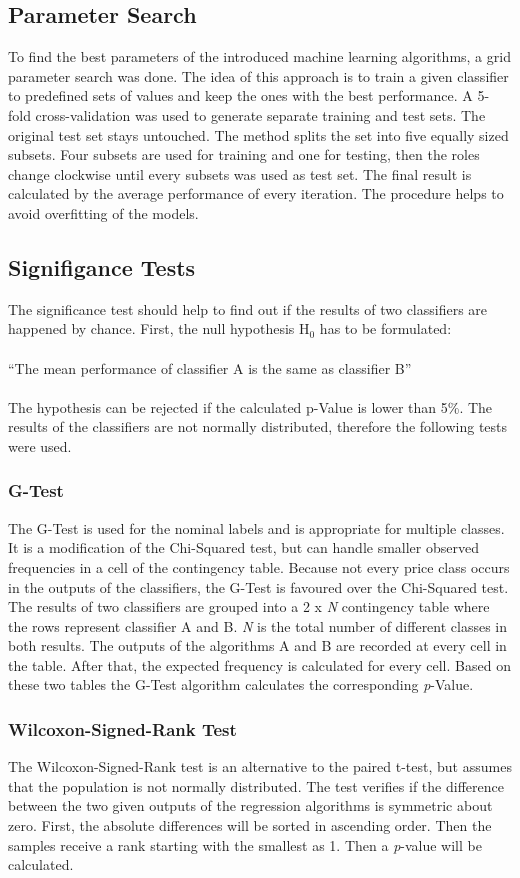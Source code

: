 \subsection{Parameter Search}
To find the best parameters of the introduced machine learning algorithms, a grid parameter search was done. The idea of this approach is to train a given classifier to predefined sets of values and keep the ones with the best performance. A 5-fold cross-validation was used to generate separate training and test sets. The original test set stays untouched. The method splits the set into five equally sized subsets. Four subsets are used for training and one for testing, then the roles change clockwise until every subsets was used as test set. The final result is calculated by the average performance of every iteration. The procedure helps to avoid overfitting of the models.
\subsection{Signifigance Tests}
The significance test should help to find out if the results of two classifiers are happened by chance. First, the null hypothesis H$_{0}$ has to be formulated:\\\\
``The mean performance of classifier A is the same as classifier B''\\\\
The hypothesis can be rejected if the calculated p-Value is lower than 5\%. The results of the classifiers are not normally distributed, therefore the following tests were used. 
\subsubsection{G-Test}
The G-Test\cite{gtest} is used for the nominal labels and is appropriate for multiple classes. It is a modification of the Chi-Squared test, but can handle smaller observed frequencies in a cell of the contingency table. Because not every price class occurs in the outputs of the classifiers, the G-Test is favoured over the Chi-Squared test. The results of two classifiers are grouped into a 2 x \textit{N} contingency table where the rows represent classifier A and B. \textit{N} is the total number of different classes in both results. The outputs of the algorithms A and B are recorded at every cell in the table. After that, the expected frequency is calculated for every cell. Based on these two tables the G-Test algorithm calculates the corresponding \textit{p}-Value. 
\subsubsection{Wilcoxon-Signed-Rank Test}
The Wilcoxon-Signed-Rank test\cite{wilcoxon} is an alternative to the paired t-test, but assumes that the population is not normally distributed. The test verifies if the difference between the two given outputs of the regression algorithms is symmetric about zero. First, the absolute differences will be sorted in ascending order. Then the samples receive a rank starting with the smallest as 1. Then a \textit{p}-value will be calculated.
